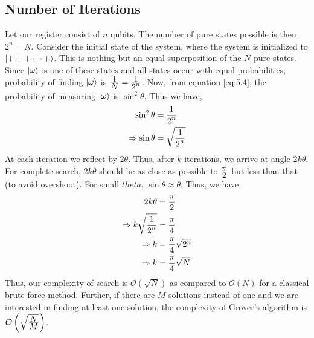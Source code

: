 \subsection{Number of Iterations}
Let our register consist of $n$ qubits. The number of pure states possible is then $2^n=N$. Consider the initial state of the system, where the system is initialized to $\left\vert +++\cdots+\right\rangle$. This is nothing but an equal superposition of the $N$ pure states. Since $\left\vert \omega\right\rangle$ is one of these states and all states occur with equal probabilities, probability of finding $\left\vert \omega\right\rangle$ is $\frac{\displaystyle 1}{\displaystyle N}=\frac{\displaystyle 1}{\displaystyle 2^n}$. Now, from equation \ref{eq:5.4}, the probability of measuring $\left\vert \omega\right\rangle$ is $\sin^2\theta$. Thus we have,
\begin{equation}
\label{eq:5.8}
\begin{split}
\sin^2\theta&=\frac{\displaystyle 1}{\displaystyle 2^n}\\
\Rightarrow \sin\theta&=\sqrt{\frac{\displaystyle 1}{\displaystyle 2^n}}\\
\end{split}
\end{equation}
At each iteration we reflect by 2$\theta$. Thus, after $k$ iterations, we arrive at angle 2$k\theta$. For complete search, 2$k\theta$ should be as close as possible to $\frac{\displaystyle \pi}{\displaystyle 2}$ but less than that (to avoid overshoot). For small $theta$, $\sin\theta\approx\theta$. Thus, we have
\begin{equation}
\label{eq:5.9}
\begin{split}
2k\theta&=\frac{\displaystyle \pi}{\displaystyle 2}\\
\Rightarrow k\sqrt{\frac{\displaystyle 1}{\displaystyle 2^n}}&=\frac{\displaystyle \pi}{\displaystyle 4}\\
\Rightarrow k&=\frac{\displaystyle \pi}{\displaystyle 4}\sqrt{2^n}\\
\Rightarrow k&=\frac{\displaystyle \pi}{\displaystyle 4}\sqrt{N}
\end{split}
\end{equation}
Thus, our complexity of search is $\mathcal{O}(\sqrt{N})$ as compared to $\mathcal{O}(N)$ for a classical brute force method. Further, if there are $M$ solutions instead of one and we are interested in finding at least one solution, the complexity of Grover's algorithm is $\mathcal{O}\left(\sqrt{\frac{\displaystyle N}{\displaystyle M}}\right)$.


